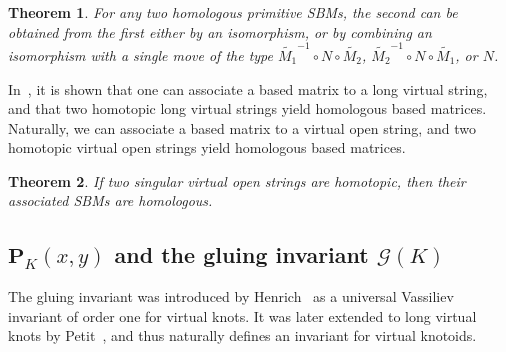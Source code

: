 \documentclass[12pt]{amsart}
\theoremstyle{noparens}
\newtheorem{theorem}{Theorem}[section]
\numberwithin{equation}{section}
\numberwithin{equation}{section}
\begin{document}
\begin{theorem}\cite[Th.~4.12]{Hen}\label{th5.1}
	For any two homologous primitive SBMs, the second can be obtained from the first either by an isomorphism, or by combining an isomorphism with a single move of the type $\widetilde{M_1}^{-1} \circ N \circ \widetilde{M_2}$, $\widetilde{M_2}^{-1} \circ N \circ \widetilde{M_1}$, or $N$. 
\end{theorem} 

In~\cite{Pet}, it is shown that one can associate a based matrix to a long virtual string, and that two homotopic long virtual strings yield homologous based matrices. Naturally, we can associate a based matrix to a virtual open string, and two homotopic virtual open strings yield homologous based matrices. 

\begin{theorem} \cite{Pet} \label{th4.1} 
	If two singular virtual open strings are homotopic, then their associated SBMs are homologous.
\end{theorem}

\subsection{$\mathbf{P}_K(x,y)$ and the gluing invariant $\mathcal G(K)$ } \label{subsection4.2}

The gluing invariant was introduced by Henrich~\cite{Hen} as a universal Vassiliev invariant of order one for virtual knots. It was later extended to long virtual knots by Petit~\cite{Pet}, and thus naturally defines an invariant for virtual knotoids.
\end{document}
